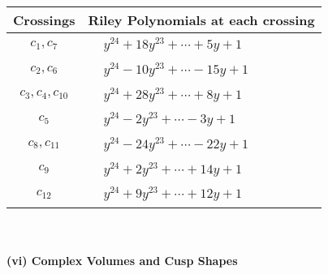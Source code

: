 \documentclass[1p]{elsarticle_modified}
\theoremstyle{definition}
\begin{document}
\begin{tabular}{m{50pt}|m{274pt}}
Crossings & \hspace{64pt}Riley Polynomials at each crossing \\
\hline $$\begin{aligned}c_{1},c_{7}\end{aligned}$$&$\begin{aligned}
&y^{24}+18 y^{23}+\cdots+5 y+1
\end{aligned}$\\
\hline $$\begin{aligned}c_{2},c_{6}\end{aligned}$$&$\begin{aligned}
&y^{24}-10 y^{23}+\cdots-15 y+1
\end{aligned}$\\
\hline $$\begin{aligned}c_{3},c_{4},c_{10}\end{aligned}$$&$\begin{aligned}
&y^{24}+28 y^{23}+\cdots+8 y+1
\end{aligned}$\\
\hline $$\begin{aligned}c_{5}\end{aligned}$$&$\begin{aligned}
&y^{24}-2 y^{23}+\cdots-3 y+1
\end{aligned}$\\
\hline $$\begin{aligned}c_{8},c_{11}\end{aligned}$$&$\begin{aligned}
&y^{24}-24 y^{23}+\cdots-22 y+1
\end{aligned}$\\
\hline $$\begin{aligned}c_{9}\end{aligned}$$&$\begin{aligned}
&y^{24}+2 y^{23}+\cdots+14 y+1
\end{aligned}$\\
\hline $$\begin{aligned}c_{12}\end{aligned}$$&$\begin{aligned}
&y^{24}+9 y^{23}+\cdots+12 y+1
\end{aligned}$\\
\hline
\end{tabular}\\~\\
\newpage\flushleft \textbf{(vi) Complex Volumes and Cusp Shapes}
\end{document}
